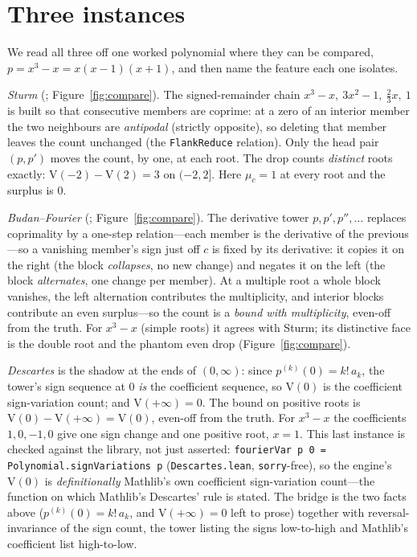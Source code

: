 \documentclass[11pt]{article}
\newcommand{\lean}[1]{\texttt{#1}}
\newcommand{\V}{\mathrm{V}}
\begin{document}
\section{Three instances}\label{sec:three}

We read all three off one worked polynomial where they can be compared, $p=x^3-x=x(x-1)(x+1)$, and then
name the feature each one isolates.

\emph{Sturm} (\cite{sturmlean}; Figure~\ref{fig:compare}). The signed-remainder chain
$x^3{-}x,\ 3x^2{-}1,\ \tfrac23 x,\ 1$ is built so that consecutive members are coprime: at a zero of an
interior member the two neighbours are \emph{antipodal} (strictly opposite), so deleting that member
leaves the count unchanged (the \lean{FlankReduce} relation). Only the head pair $(p,p')$ moves the
count, by one, at each root. The drop counts \emph{distinct} roots exactly: $\V(-2)-\V(2)=3$ on $(-2,2]$.
Here $\mu_c=1$ at every root and the surplus is $0$.

\emph{Budan--Fourier} (\cite{budanlean}; Figure~\ref{fig:compare}). The derivative tower
$p,p',p'',\dots$ replaces coprimality by a one-step relation---each member is the derivative of the
previous---so a vanishing member's sign just off $c$ is fixed by its derivative: it copies it on the
right (the block \emph{collapses}, no new change) and negates it on the left (the block
\emph{alternates}, one change per member). At a multiple root a whole block vanishes, the left
alternation contributes the multiplicity, and interior blocks contribute an even surplus---so the count
is a \emph{bound with multiplicity}, even-off from the truth. For $x^3-x$ (simple roots) it agrees with
Sturm; its distinctive face is the double root and the phantom even drop (Figure~\ref{fig:compare}).

\emph{Descartes} is the shadow at the ends of $(0,\infty)$: since $p^{(k)}(0)=k!\,a_k$, the tower's sign
sequence at $0$ \emph{is} the coefficient sequence, so $\V(0)$ is the coefficient sign-variation count;
and $\V(+\infty)=0$. The bound on positive roots is $\V(0)-\V(+\infty)=\V(0)$, even-off from the truth.
For $x^3-x$ the coefficients $1,0,-1,0$ give one sign change and one positive root, $x=1$. This last
instance is checked against the library, not just asserted: \lean{fourierVar p 0 =
Polynomial.signVariations p} (\lean{Descartes.lean}, \lean{sorry}-free), so the engine's $\V(0)$ is
\emph{definitionally} Mathlib's own coefficient sign-variation count---the function on which Mathlib's
Descartes' rule is stated. The bridge is the two facts above ($p^{(k)}(0)=k!\,a_k$, and
$\V(+\infty)=0$ left to prose) together with reversal-invariance of the sign count, the tower listing
the signs low-to-high and Mathlib's coefficient list high-to-low.
\end{document}

